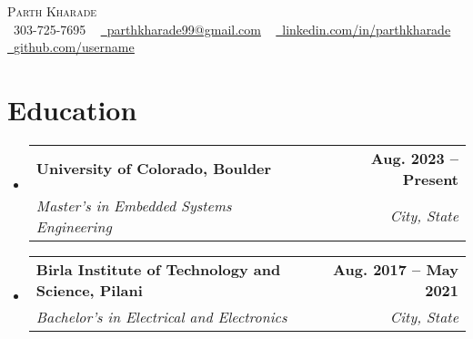 \documentclass[letterpaper,11pt]{article}
\makeatletter
\newcommand{\resumeSubheading}[4]{
  \vspace{-2pt}\item
    \begin{tabular*}{1.0\textwidth}[t]{l@{\extracolsep{\fill}}r}
      \textbf{#1} & \textbf{\small #2} \\
      \textit{\small#3} & \textit{\small #4} \\
    \end{tabular*}\vspace{-7pt}
}
\newcommand{\resumeSubHeadingListStart}{\begin{itemize}[leftmargin=0.0in, label={}]}
\newcommand{\resumeSubHeadingListEnd}{\end{itemize}}
\makeatother
\begin{document}
\begin{center}
    {\Huge \scshape Parth Kharade} \\ \vspace{1pt}
    \small \raisebox{-0.1\height}\faPhone\ 303-725-7695 ~ \href{mailto:parthkharade99@gmail.com}{\raisebox{-0.2\height}\faEnvelope\  \underline{parthkharade99@gmail.com}} ~ 
    \href{https://www.linkedin.com/in/parth-k-081287184/}{\raisebox{-0.2\height}\faLinkedin\ \underline{linkedin.com/in/parthkharade}}  ~
    \href{https://github.com/}{\raisebox{-0.2\height}\faGithub\ \underline{github.com/username}}
    \vspace{-8pt}
\end{center}


\section{Education}
  \resumeSubHeadingListStart
    \resumeSubheading
      {University of Colorado, Boulder}{Aug. 2023 -- Present}
      {Master's in Embedded Systems Engineering}{City, State}
    \resumeSubheading
      {Birla Institute of Technology and Science, Pilani}{Aug. 2017 -- May 2021}
      {Bachelor's in Electrical and Electronics}{City, State}
  \resumeSubHeadingListEnd
 \vspace{-8pt}
\end{document}
